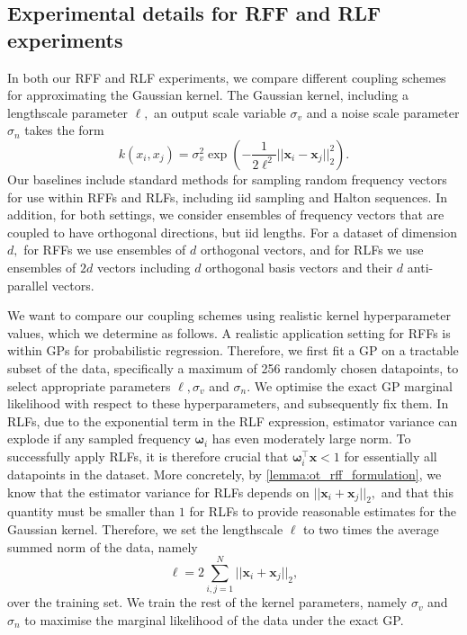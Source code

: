 \subsection{Experimental details for RFF and RLF experiments}

In both our RFF and RLF experiments, we compare different coupling schemes for approximating the Gaussian kernel.
The Gaussian kernel, including a lengthscale parameter $\ell,$ an output scale variable $\sigma_v$ and a noise scale parameter $\sigma_n$ takes the form
$$k(x_i, x_j) = \sigma_v^2 \exp\left(-\frac{1}{2 \ell^2} ||\boldsymbol{x}_i - \boldsymbol{x}_j||_2^2\right).$$
Our baselines include standard methods for sampling random frequency vectors for use within RFFs and RLFs, including iid sampling and Halton sequences.
In addition, for both settings, we consider ensembles of frequency vectors that are coupled to have orthogonal directions, but iid lengths.
For a dataset of dimension $d,$ for RFFs we use ensembles of $d$ orthogonal vectors, and for RLFs we use ensembles of $2d$ vectors including $d$ orthogonal basis vectors and their $d$ anti-parallel vectors.

We want to compare our coupling schemes using realistic kernel hyperparameter values, which we determine as follows.
A realistic application setting for RFFs is within GPs for probabilistic regression.
Therefore, we first fit a GP on a tractable subset of the data, specifically a maximum of 256 randomly chosen datapoints, to select appropriate parameters  $\ell, \sigma_v$ and $\sigma_n.$
We optimise the exact GP marginal likelihood with respect to these hyperparameters, and subsequently fix them.
In RLFs, due to the exponential term in the RLF expression, estimator variance can explode if any sampled frequency $\boldsymbol{\omega}_i$ has even moderately large norm.
To successfully apply RLFs, it is therefore crucial that $\boldsymbol{\omega}_i^\top \boldsymbol{x} < 1$ for essentially all datapoints in the dataset.
More concretely, by \cref{lemma:ot_rff_formulation}, we know that the estimator variance for RLFs depends on $||\boldsymbol{x}_i + \boldsymbol{x}_j||_2,$ and that this quantity must be smaller than $1$ for RLFs to provide reasonable estimates for the Gaussian kernel.
Therefore, we set the lengthscale $\ell$ to two times the average summed norm of the data, namely
$$\ell = 2 \sum_{i,j=1}^N ||\boldsymbol{x}_i + \boldsymbol{x}_j||_2,$$
over the training set.
We train the rest of the kernel parameters, namely $\sigma_v$ and $\sigma_n$ to maximise the marginal likelihood of the data under the exact GP.

